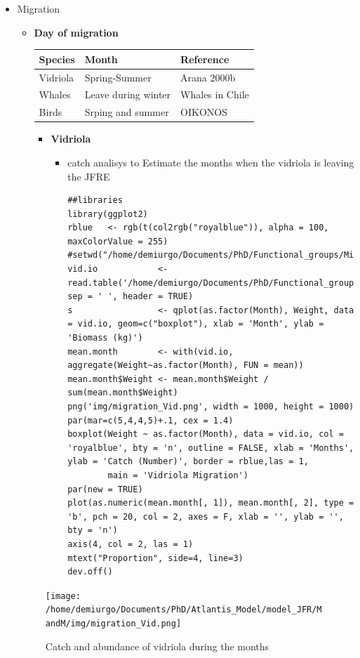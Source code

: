 \documentclass[11pt]{article}
\begin{document}
\begin{itemize}
\item Migration
\label{sec-5-2-1-6-4}%
\begin{itemize}
\item \textbf{Day of migration}

\begin{center}
\begin{tabular}{lll}
 Species   &  Month                &  Reference        \\
\hline
 Vidriola  &  Spring-Summer        &  Arana 2000b      \\
 Whales    &  Leave during winter  &  Whales in Chile  \\
 Birds     &  Srping and summer    &  OIKONOS          \\
\end{tabular}
\end{center}


\begin{itemize}
\item \textbf{Vidriola}
\begin{itemize}
\item catch analisys to Estimate the months when the vidriola is leaving the JFRE

\begin{verbatim}
##libraries
library(ggplot2)
rblue   <- rgb(t(col2rgb("royalblue")), alpha = 100, maxColorValue = 255)
#setwd("/home/demiurgo/Documents/PhD/Functional_groups/Migration/Vidriola/")
vid.io            <- read.table('/home/demiurgo/Documents/PhD/Functional_groups/Migration/Vidriola/Vid_month.txt', sep = ' ', header = TRUE)
s                 <- qplot(as.factor(Month), Weight, data = vid.io, geom=c("boxplot"), xlab = 'Month', ylab = 'Biomass (kg)')
mean.month        <- with(vid.io, aggregate(Weight~as.factor(Month), FUN = mean))
mean.month$Weight <- mean.month$Weight / sum(mean.month$Weight)
png('img/migration_Vid.png', width = 1000, height = 1000)
par(mar=c(5,4,4,5)+.1, cex = 1.4)
boxplot(Weight ~ as.factor(Month), data = vid.io, col = 'royalblue', bty = 'n', outline = FALSE, xlab = 'Months', ylab = 'Catch (Number)', border = rblue,las = 1,
        main = 'Vidriola Migration')
par(new = TRUE)
plot(as.numeric(mean.month[, 1]), mean.month[, 2], type = 'b', pch = 20, col = 2, axes = F, xlab = '', ylab = '', bty = 'n')
axis(4, col = 2, las = 1)
mtext("Proportion", side=4, line=3)
dev.off()
\end{verbatim}
\end{itemize}
\end{itemize}
\end{itemize}
       \begin{figure}[htb]
       \centering
       \texttt{[image: /home/demiurgo/Documents/PhD/Atlantis\_Model/model\_JFR/MandM/img/migration\_Vid.png]}
       \caption{Catch and abundance of vidriola during the months}
       \end{figure}



\end{itemize}
\end{document}
